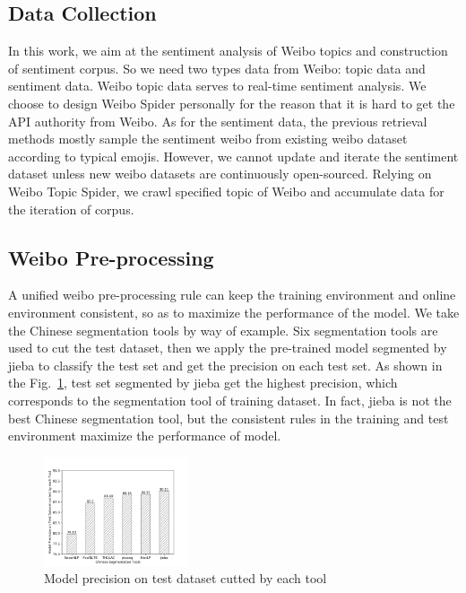 \documentclass[runningheads]{llncs}
\begin{document}
\subsection{Data Collection}

In this work, we aim at the sentiment analysis of Weibo topics and construction of sentiment corpus. So we need two types data from Weibo: topic data and sentiment data. Weibo topic data serves to real-time sentiment analysis. We choose to design Weibo Spider personally for the reason that it is hard to get the API authority from Weibo. As for the sentiment data, the previous retrieval methods mostly sample the sentiment weibo from existing weibo dataset according to typical emojis. However, we cannot update and iterate the sentiment dataset unless new weibo datasets are continuously open-sourced. Relying on Weibo Topic Spider, we crawl specified topic of Weibo and accumulate data for the iteration of corpus.

\subsection{Weibo Pre-processing}

A unified weibo pre-processing rule can keep the training environment and online environment consistent, so as to maximize the performance of the model. We take the Chinese segmentation tools by way of example. Six segmentation tools are used to cut the test dataset, then we apply the pre-trained model segmented by jieba to classify the test set and get the precision on each test set. As shown in the Fig.~\ref{fig:segmentation-tools-precision}, test set segmented by jieba get the highest precision, which corresponds to the segmentation tool of training dataset. In fact, jieba is not the best Chinese segmentation tool, but the consistent rules in the training and test environment maximize the performance of model.

\begin{figure}[htp]
\begin{center}
\includegraphics[width=0.38\textwidth]{images/model-precision-on-test-dataset-cutted-by-each-tool.png}
\caption{Model precision on test dataset cutted by each tool}
\label{fig:segmentation-tools-precision}
\end{center}
\end{figure}
\end{document}
